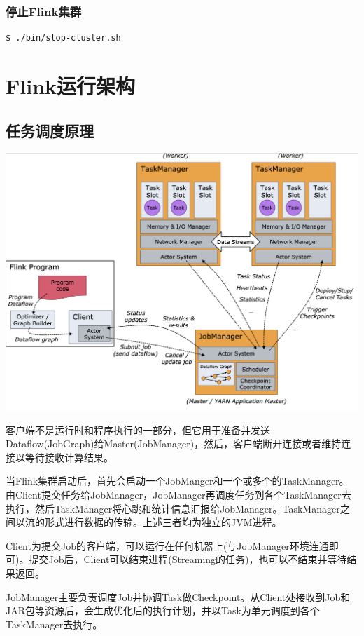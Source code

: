 \documentclass[oneside]{ctexbook}
\begin{document}
\subsection{停止Flink集群}

\begin{lstlisting}
$ ./bin/stop-cluster.sh
\end{lstlisting}

\chapter{Flink运行架构}

\section{任务调度原理}

\noindent \includegraphics[width=\textwidth]{processes.png}

客户端不是运行时和程序执行的一部分，但它用于准备并发送Dataflow(JobGraph)给Master(JobManager)，然后，客户端断开连接或者维持连接以等待接收计算结果。

当Flink集群启动后，首先会启动一个JobManger和一个或多个的TaskManager。由Client提交任务给JobManager，JobManager再调度任务到各个TaskManager去执行，然后TaskManager将心跳和统计信息汇报给JobManager。TaskManager之间以流的形式进行数据的传输。上述三者均为独立的JVM进程。

Client为提交Job的客户端，可以运行在任何机器上(与JobManager环境连通即可)。提交Job后，Client可以结束进程(Streaming的任务)，也可以不结束并等待结果返回。

JobManager主要负责调度Job并协调Task做Checkpoint。从Client处接收到Job和JAR包等资源后，会生成优化后的执行计划，并以Task为单元调度到各个TaskManager去执行。
\end{document}
